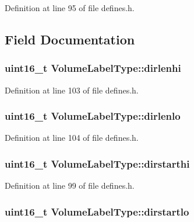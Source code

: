 Definition at line 95 of file defines.\+h.



\subsection{Field Documentation}
\subsubsection[{\texorpdfstring{dirlenhi}{dirlenhi}}]{\setlength{\rightskip}{0pt plus 5cm}uint16\+\_\+t Volume\+Label\+Type\+::dirlenhi}\hypertarget{structVolumeLabelType_a6fa349ef78a7ea0a3006e0c1f4f3a155}{}\label{structVolumeLabelType_a6fa349ef78a7ea0a3006e0c1f4f3a155}


Definition at line 103 of file defines.\+h.

\subsubsection[{\texorpdfstring{dirlenlo}{dirlenlo}}]{\setlength{\rightskip}{0pt plus 5cm}uint16\+\_\+t Volume\+Label\+Type\+::dirlenlo}\hypertarget{structVolumeLabelType_ae1c5205294bf4588b931057d03853d66}{}\label{structVolumeLabelType_ae1c5205294bf4588b931057d03853d66}


Definition at line 104 of file defines.\+h.

\subsubsection[{\texorpdfstring{dirstarthi}{dirstarthi}}]{\setlength{\rightskip}{0pt plus 5cm}uint16\+\_\+t Volume\+Label\+Type\+::dirstarthi}\hypertarget{structVolumeLabelType_aac87a089bec0cf282bf23038937d7635}{}\label{structVolumeLabelType_aac87a089bec0cf282bf23038937d7635}


Definition at line 99 of file defines.\+h.

\subsubsection[{\texorpdfstring{dirstartlo}{dirstartlo}}]{\setlength{\rightskip}{0pt plus 5cm}uint16\+\_\+t Volume\+Label\+Type\+::dirstartlo}\hypertarget{structVolumeLabelType_a193c89f442656a080244f284f1bc008a}{}\label{structVolumeLabelType_a193c89f442656a080244f284f1bc008a}


